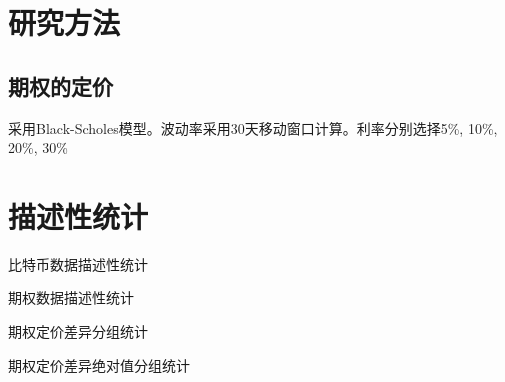 \documentclass[degree=bachelor]{thuthesis}
\begin{document}
\chapter{研究方法}
    \section{期权的定价}
    采用Black-Scholes模型。波动率采用30天移动窗口计算。利率分别选择5\%, 10\%, 20\%, 30\%

\chapter{描述性统计}

\begin{table}[!ht]
    \caption{比特币数据描述性统计}
    
\end{table}
\begin{table}[!ht]
    \caption{期权数据描述性统计}

\end{table}
\begin{table}[!ht]
    \caption{期权定价差异分组统计}
    
\end{table}
\begin{table}[!ht]
    \caption{期权定价差异绝对值分组统计}
    
\end{table}
\end{document}
